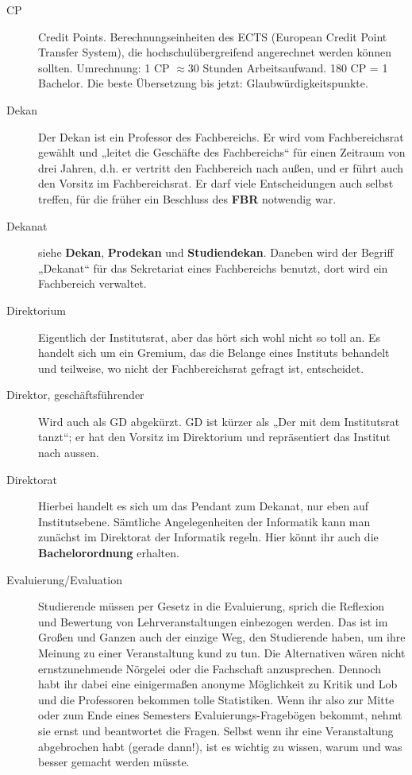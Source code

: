 \begin{description}
\item[CP] Credit Points. Berechnungseinheiten des ECTS (European
Credit Point Transfer System), die hochschulübergreifend angerechnet
werden können sollten. Umrechnung: 1 CP $\approx30$ Stunden
Arbeitsaufwand. 180 CP = 1 Bachelor. Die beste Übersetzung bis jetzt:
Glaubwürdigkeitspunkte.


\item[Dekan] Der Dekan ist ein Professor des Fachbereichs. Er wird vom
Fachbereichsrat gewählt und „leitet die Geschäfte des Fachbereichs“
für einen Zeitraum von drei Jahren, d.h. er vertritt den Fachbereich
nach außen, und er führt auch den Vorsitz im Fachbereichsrat. Er darf
viele Entscheidungen auch selbst treffen, für die früher ein Beschluss
des \textbf{FBR} notwendig war.


\item[Dekanat] siehe \textbf{Dekan}, \textbf{Prodekan} und
\textbf{Studiendekan}. Daneben wird der Begriff „Dekanat“ für das
Sekretariat eines Fachbereichs benutzt, dort wird ein Fachbereich
verwaltet.


\item[Direktorium] Eigentlich der Institutsrat, aber das hört sich
wohl nicht so toll an. Es handelt sich um ein Gremium, das die Belange
eines Instituts behandelt und teilweise, wo nicht der  Fachbereichsrat
gefragt ist, entscheidet.


\item[Direktor, geschäftsführender] Wird auch als GD abgekürzt. GD ist
kürzer als „Der mit dem Institutsrat tanzt“; er hat den Vorsitz im
Direktorium und repräsentiert das Institut nach aussen.


\item[Direktorat] Hierbei handelt es sich um das Pendant zum Dekanat,
nur eben auf Institutsebene. Sämtliche Angelegenheiten der Informatik
kann man zunächst im Direktorat der Informatik regeln. Hier könnt ihr
auch die \textbf{Bachelorordnung} erhalten.


\item[Evaluierung/Evaluation] Studierende müssen per Gesetz in die
Evaluierung, sprich die Reflexion und Bewertung von Lehrveranstaltungen
einbezogen werden. Das ist im Großen und Ganzen auch der einzige
Weg, den Studierende haben, um ihre Meinung zu einer Veranstaltung
kund zu tun. Die Alternativen wären nicht ernstzunehmende Nörgelei
oder die Fachschaft anzusprechen. Dennoch habt ihr dabei eine
einigermaßen anonyme Möglichkeit zu Kritik und Lob und die Professoren
bekommen tolle Statistiken. Wenn ihr also zur Mitte  oder zum Ende
eines Semesters Evaluierungs-Fragebögen bekommt, nehmt sie
ernst und beantwortet die Fragen. Selbst wenn ihr eine Veranstaltung
abgebrochen habt (gerade dann!), ist es wichtig zu wissen, warum und
was besser gemacht werden müsste.



\end{description}
